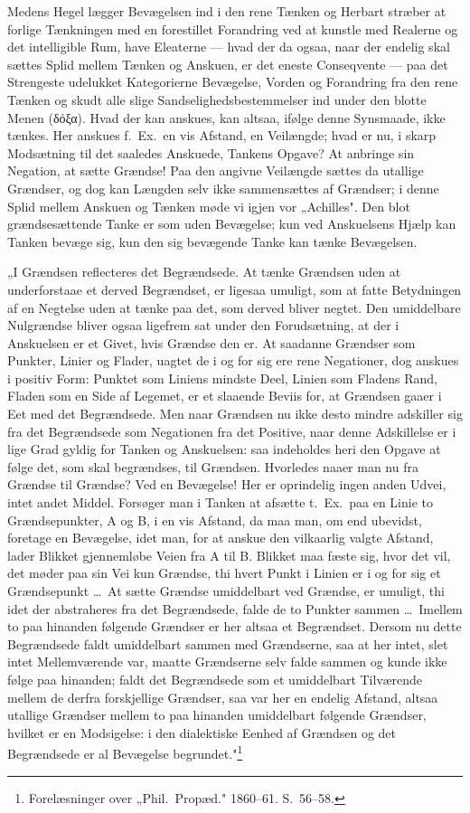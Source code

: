 \documentclass[12pt]{book}
\newcommand{\opage}[1]{\marginnote{\footnotesize\textit{[#1]}}}
\begin{document}
Medens Hegel lægger Bevægelsen ind i den rene Tænken og Herbart stræber at forlige
Tænkningen med en forestillet
\opage{21} Forandring ved at kunstle med Realerne og det intelligible Rum, have Eleaterne ---
hvad der da ogsaa, naar der endelig skal sættes Splid mellem Tænken og Anskuen, er det
eneste Conseqvente --- paa det Strengeste udelukket Kategorierne Bevægelse, Vorden og
Forandring fra den rene Tænken og skudt alle slige Sandselighedsbestemmelser ind under
den blotte Menen (δόξα). Hvad der kan anskues, kan altsaa, ifølge denne Synsmaade,
ikke tænkes. Her anskues f.\ Ex.\ en vis Afstand, en Veilængde; hvad er nu, i skarp
Modsætning til det saaledes Anskuede, Tankens Opgave? At anbringe sin Negation, at
sætte Grændse! Paa den angivne Veilængde sættes da utallige Grændser, og dog kan
Længden selv ikke sammensættes af Grændser; i denne Splid mellem Anskuen og Tænken
møde vi igjen vor „Achilles". Den blot grændsesættende Tanke er som uden Bevægelse;
kun ved Anskuelsens Hjælp kan Tanken bevæge sig, kun den sig bevægende Tanke kan tænke
Bevægelsen.

„I Grændsen reflecteres det Begrændsede. At tænke Grændsen uden at underforstaae et
derved Begrændset, er ligesaa umuligt, som at fatte Betydningen af en Negtelse uden at
tænke paa det, som derved bliver negtet. Den umiddelbare Nulgrændse bliver ogsaa
ligefrem sat under den Forudsætning, at der i Anskuelsen er et Givet, hvis Grændse den
er. At saadanne Grændser som Punkter, Linier og Flader, uagtet de i og for sig ere
rene Negationer, dog anskues i positiv Form: Punktet som Liniens mindste Deel, Linien
som Fladens Rand, Fladen som en Side af Legemet, er et slaaende Beviis for, at
Grændsen gaaer i Eet med det Begrændsede. Men naar Grændsen nu ikke desto mindre
adskiller sig fra det Begrændsede som Negationen fra det Positive, naar denne
Adskillelse er i lige Grad gyldig for Tanken og Anskuelsen: saa indeholdes heri den
Opgave at følge det, som skal begrændses, til Grændsen. Hvorledes naaer man nu fra
Grændse til Grændse? Ved en Bevægelse! Her er
\opage{22} oprindelig ingen anden Udvei, intet andet Middel. Forsøger man i Tanken at afsætte t.\
Ex.\ paa en Linie to Grændsepunkter, A og B, i en vis Afstand, da maa man, om end
ubevidst, foretage en Bevægelse, idet man, for at anskue den vilkaarlig valgte
Afstand, lader Blikket gjennemløbe Veien fra A til B. Blikket maa fæste sig, hvor det
vil, det møder paa sin Vei kun Grændse, thi hvert Punkt i Linien er i og for sig et
Grændsepunkt \dots\ At sætte Grændse umiddelbart ved Grændse, er umuligt, thi idet der
abstraheres fra det Begrændsede, falde de to Punkter sammen \dots\ Imellem to paa
hinanden følgende Grændser er her altsaa et Begrændset. Dersom nu dette Begrændsede
faldt umiddelbart sammen med Grændserne, saa at her intet, slet intet Mellemværende
var, maatte Grændserne selv falde sammen og kunde ikke følge paa hinanden; faldt det
Begrændsede som et umiddelbart Tilværende mellem de derfra forskjellige Grændser, saa
var her en endelig Afstand, altsaa utallige Grændser mellem to paa hinanden umiddelbart
følgende Grændser, hvilket er en Modsigelse: i den dialektiske Eenhed af Grændsen og
det Begrændsede er al Bevægelse begrundet."\footnote{Forelæsninger over „Phil.\
Propæd." 1860--61. S.~56--58.}
\end{document}
